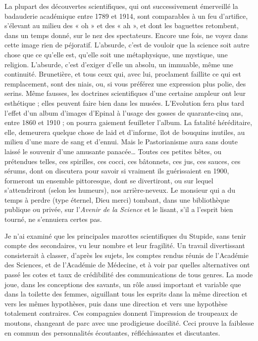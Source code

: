\documentclass[french,twoside]{book} %
\begin{document}
La plupart des découvertes scientifiques, qui ont successivement émerveillé la badauderie académique entre 1789 et 1914, sont comparables à un feu d’artifice, s’élevant au milieu des « oh » et des « ah », et dont les baguettes retombent, dans un temps donné, sur le nez des spectateurs. Encore une fois, ne voyez dans cette image rien de péjoratif. L’absurde, c’est de vouloir que la science soit autre chose que ce qu’elle est, qu’elle soit une métaphysique, une mystique, une religion. L’absurde, c’est d’exiger d’elle un absolu, un immuable, même une continuité. Brunetière, et tous ceux qui, avec lui, proclament faillite ce qui est remplacement, sont des niais, ou, si vous préférez une expression plus polie, des serins. Même fausses, les doctrines scientifiques d’une certaine ampleur ont leur esthétique ; elles peuvent faire bien dans les musées. L’Evolution fera plus tard l’effet d’un album d’images d’Epinal à l’usage des gosses de quarante-cinq ans, entre 1860 et 1910 ; on pourra gaiement feuilleter l’album. La fatalité héréditaire, elle, demeurera quelque chose de laid et d’informe, îlot de bouquins inutiles, au milieu d’une mare de sang et d’ennui. Mais le Pastorianisme aura sans doute laissé le souvenir d’une amusante panacée… Toutes ces petites bêtes, ou prétendues telles, ces spirilles, ces cocci, ces bâtonnets, ces jus, ces sauces, ces sérums, dont on discutera pour savoir si vraiment ils guérissaient en 1900, formeront un ensemble pittoresque, dont se divertiront, ou sur lequel s’attendriront (selon les humeurs), nos arrière-neveux. Le monsieur qui a du temps à perdre (type éternel, Dieu merci) tombant, dans une bibliothèque publique ou privée, sur l’{\itshape Avenir de la Science} et le lisant, s’il a l’esprit bien tourné, ne s’ennuiera certes pas.\par
Je n’ai examiné que les principales marottes scientifiques du Stupide, sans tenir compte des secondaires, vu leur nombre et leur fragilité. Un travail divertissant consisterait à classer, d’après les sujets, les comptes rendus réunis de l’Académie des Sciences, et de l’Académie de Médecine, et à voir par quelles alternatives ont passé les cotes et taux de crédibilité des communications de tous genres. La mode joue, dans les conceptions des savants, un rôle aussi important et variable que dans la toilette des femmes, aiguillant tous les esprits dans la même direction et vers les mêmes hypothèses, puis dans une direction et vers une hypothèse totalement contraires. Ces compagnies donnent l’impression de troupeaux de moutons, changeant de parc avec une prodigieuse docilité. Ceci prouve la faiblesse en commun des personnalités écoutantes, réfléchissantes et discutantes.\par
\end{document}

